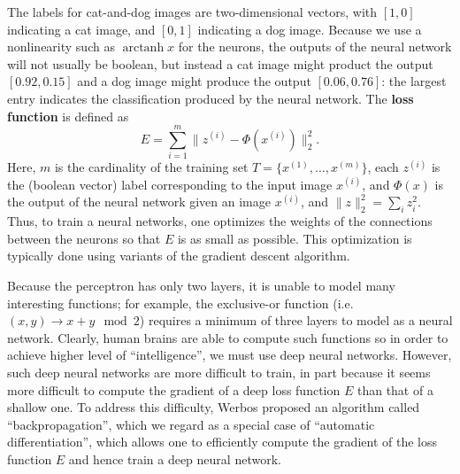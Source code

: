 \documentclass[titlepage]{article}
\theoremstyle{plain}
\theoremstyle{definition}
\begin{document}
		The labels for cat-and-dog images are two-dimensional vectors, with $[1,0]$ indicating a cat image, and $[0,1]$ indicating a dog image. Because we use a nonlinearity such as $\operatorname{arctanh} x$ for the neurons, the outputs of the neural network will not usually be boolean, but instead a cat image might product the output $[0.92,0.15]$ and a dog image might produce the output $[0.06,0.76]$: the largest entry indicates the classification produced by the neural network. The {\bf loss function} is defined as
		$$E = \sum_{i=1}^m \|z^{(i)} - \Phi(x^{(i)})\|_2^2.$$
		Here, $m$ is the cardinality of the training set $T = \{x^{(1)},\ldots,x^{(m)}\}$, each $z^{(i)}$ is the (boolean vector) label corresponding to the input image $x^{(i)}$, and $\Phi(x)$ is the output of the neural network given an image $x^{(i)}$, and $\|z\|_2^2 = \sum_i z_i^2$. Thus, to train a neural networks, one optimizes the weights of the connections between the neurons so that $E$ is as small as possible. This optimization is typically done using variants of the gradient descent algorithm.
		
		Because the perceptron has only two layers, it is unable to model many interesting functions; for example, the exclusive-or function (i.e. $(x,y) \to x+y \mod 2$) requires a minimum of three layers to model as a neural network. Clearly, human brains are able to compute such functions so in order to achieve higher level of ``intelligence'', we must use deep neural networks. However, such deep neural networks are more difficult to train, in part because it seems more difficult to compute the gradient of a deep loss function $E$ than that of a shallow one. To address this difficulty, Werbos \cite{Werbos} proposed an algorithm called ``backpropagation'', which we regard as a special case of ``automatic differentiation'', which allows one to efficiently compute the gradient of the loss function $E$ and hence train a deep neural network.
		
\end{document}
